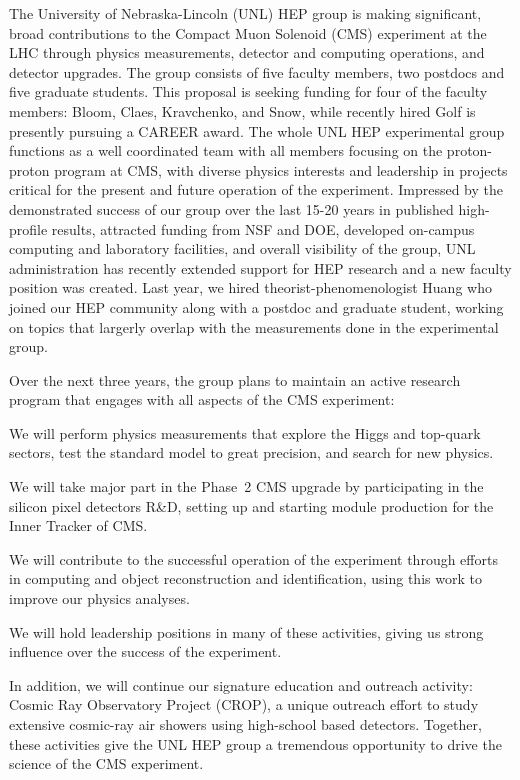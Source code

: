  The University of Nebraska-Lincoln (UNL) HEP group is making significant, broad contributions to the Compact Muon Solenoid (CMS) experiment at the LHC through physics measurements, detector and computing operations, and detector upgrades. The group consists of five faculty members, two postdocs and five graduate students. This proposal is seeking funding for four of the faculty members: Bloom, Claes, Kravchenko, and Snow, while recently hired Golf is presently pursuing a CAREER award. The whole UNL HEP experimental group functions as a well coordinated team with all members focusing on the proton-proton program at CMS, with diverse physics interests and leadership in projects critical for the present and future operation of the experiment. Impressed by the demonstrated success of our group over the last 15-20 years in published high-profile results, attracted funding from NSF and DOE, developed on-campus computing and laboratory facilities, and overall visibility of the group, UNL administration has recently extended support for HEP research and a new faculty position was created. Last year, we hired theorist-phenomenologist Huang who joined our HEP community along with a postdoc and graduate student, working on topics that largerly overlap with the measurements done in the experimental group. 

Over the next three years, the group plans to maintain an active research program that engages with all aspects of the CMS experiment:

\begin{packed_enum}
\item We will perform physics measurements that explore the Higgs and top-quark sectors, test the standard model to great precision, and search for new physics.
\item We will take major part in the Phase~2 CMS upgrade by participating in the silicon pixel detectors R\&D, setting up and starting module production for the Inner Tracker of CMS.
\item We will contribute to the successful operation of the experiment through efforts in computing and object reconstruction and identification, using this work to improve our physics analyses.
\item We will hold leadership positions in many of these activities, giving us strong influence over the success of the experiment.
\end{packed_enum}

In addition, we will continue our signature  education and outreach activity: Cosmic Ray Observatory Project (CROP), a unique outreach effort to study extensive cosmic-ray air showers using high-school based detectors.
Together, these activities give the UNL HEP group a tremendous opportunity to drive the science of the CMS experiment.


